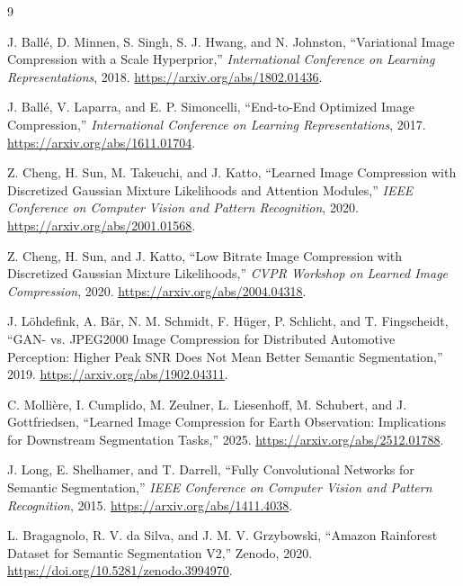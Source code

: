 \documentclass[10pt,a4paper]{article}
\begin{document}
\begin{thebibliography}{9}

J. Ball\'e, D. Minnen, S. Singh, S. J. Hwang, and N. Johnston,
``Variational Image Compression with a Scale Hyperprior,''
\emph{International Conference on Learning Representations}, 2018.
\url{https://arxiv.org/abs/1802.01436}.

J. Ball\'e, V. Laparra, and E. P. Simoncelli,
``End-to-End Optimized Image Compression,''
\emph{International Conference on Learning Representations}, 2017.
\url{https://arxiv.org/abs/1611.01704}.

Z. Cheng, H. Sun, M. Takeuchi, and J. Katto,
``Learned Image Compression with Discretized Gaussian Mixture Likelihoods
and Attention Modules,''
\emph{IEEE Conference on Computer Vision and Pattern Recognition}, 2020.
\url{https://arxiv.org/abs/2001.01568}.

Z. Cheng, H. Sun, and J. Katto,
``Low Bitrate Image Compression with Discretized Gaussian Mixture
Likelihoods,''
\emph{CVPR Workshop on Learned Image Compression}, 2020.
\url{https://arxiv.org/abs/2004.04318}.

J. L\"ohdefink, A. B\"ar, N. M. Schmidt, F. H\"uger, P. Schlicht, and
T. Fingscheidt,
``GAN- vs. JPEG2000 Image Compression for Distributed Automotive
Perception: Higher Peak SNR Does Not Mean Better Semantic Segmentation,''
2019. \url{https://arxiv.org/abs/1902.04311}.

C. Molli\`ere, I. Cumplido, M. Zeulner, L. Liesenhoff, M. Schubert, and
J. Gottfriedsen,
``Learned Image Compression for Earth Observation: Implications for
Downstream Segmentation Tasks,'' 2025.
\url{https://arxiv.org/abs/2512.01788}.

J. Long, E. Shelhamer, and T. Darrell,
``Fully Convolutional Networks for Semantic Segmentation,''
\emph{IEEE Conference on Computer Vision and Pattern Recognition}, 2015.
\url{https://arxiv.org/abs/1411.4038}.

L. Bragagnolo, R. V. da Silva, and J. M. V. Grzybowski,
``Amazon Rainforest Dataset for Semantic Segmentation V2,''
Zenodo, 2020.
\url{https://doi.org/10.5281/zenodo.3994970}.

\end{thebibliography}
\end{document}
